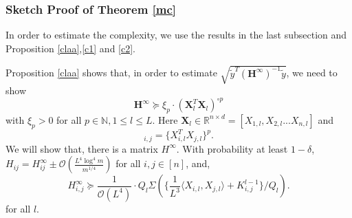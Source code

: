 \documentclass{article}
\newcommand{\cO}{\mathcal{O}}
\begin{document}
\subsubsection{Sketch Proof of Theorem \ref{mc}}
In order to estimate the complexity, we use the results in the last subsection and Proposition  \ref{claa},\ref{c1} and \ref{c2}.

Proposition \ref{claa} shows that, in order to estimate $\sqrt{\widetilde{y}^T (\bm{H}^{\infty})^{-1}\widetilde{y}}$, we need to show
\begin{equation}
\bm{H}^\infty \succeq \xi_p\cdot  (\bm{X}_l^T\bm{X}_l)^{\circ p}
\end{equation}
with $\xi_p>0$ for all $p\in \mathbb{N}, 1\leq l\leq L$.
Here $\bm{X}_l\in \mathbb{R}^{n\times d}=[X_{1,l}, X_{2,l}... X_{n,l}]$ and
\begin{equation}
[(\bm{X}_l^T\bm{X}_l)^{\circ p}]_{i,j}=\{X_{i,l}^TX_{j,l}\}^p.
\end{equation}
 We will show that, there is a matrix $H^{\infty}$. With probability at least $1-\delta$, $H_{ij}=H^{\infty}_{ij}\pm  \cO(\frac{L^4\log^4 m}{m^{1/4}})$ for all $i,j\in [n]$, and,
\begin{equation}\label{eh}
H^{\infty}_{i,j}\succeq\frac{1}{\cO(L^4)}\cdot Q_l\Sigma(\{\frac{1}{L^3}\langle X_{i,l}, X_{j,l} \rangle + K^{l-1}_{i,j}\}/Q_l).
\end{equation}
for all $l$.

\end{document}
